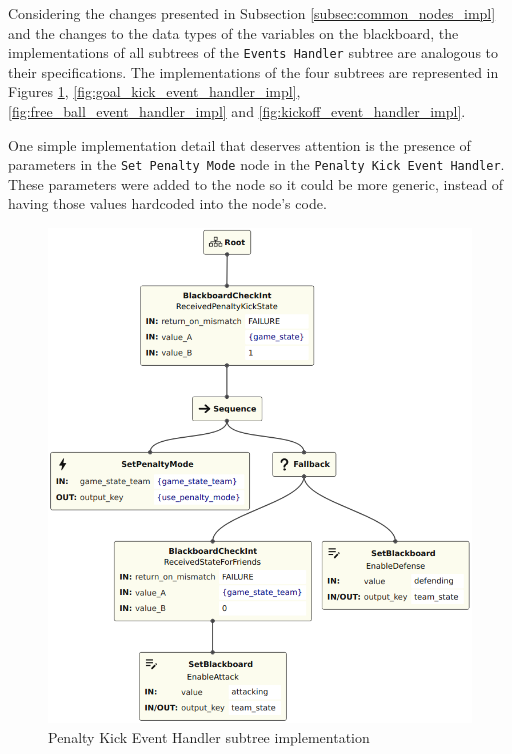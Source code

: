 Considering the changes presented in Subsection \ref{subsec:common_nodes_impl} and the changes to the data types of the variables on the blackboard, the implementations of all subtrees of the \texttt{Events Handler} subtree are analogous to their specifications. The implementations of the four subtrees are represented in Figures \ref{fig:penalty_kick_event_handler_impl}, \ref{fig:goal_kick_event_handler_impl}, \ref{fig:free_ball_event_handler_impl} and \ref{fig:kickoff_event_handler_impl}.

One simple implementation detail that deserves attention is the presence of parameters in the \texttt{Set Penalty Mode} node in the \texttt{Penalty Kick Event Handler}. These parameters were added to the node so it could be more generic, instead of having those values hardcoded into the node's code.

\begin{figure}[!h]
    \centering
    \includegraphics[width=0.7\linewidth]{chapters/development/images/PenaltyKickEventHandler.png}
    \caption{Penalty Kick Event Handler subtree implementation}
    \label{fig:penalty_kick_event_handler_impl}
\end{figure}

